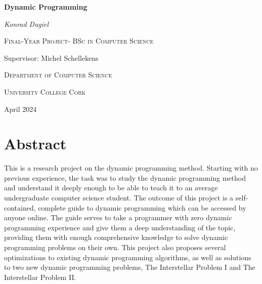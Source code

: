 \documentclass[12pt]{report}
\theoremstyle{definition}
\begin{document}
\begin{titlepage}
    \centering
    {\huge\bfseries Dynamic Programming\par}
    \vspace{2cm}
    {\Large\itshape Konrad Dagiel\par}
    \vspace{1cm}
    {\scshape\Large Final-Year Project- BSc in Computer Science \par}
    \vspace{1cm}
    {\Large Supervisor: Michel Schellekens \par}
    \vspace{1cm}
    {\scshape\Large Department of Computer Science \par}
    \vspace{1cm}
    {\scshape\LARGE University College Cork \par}
    \vspace{1.5cm}
    {\large April 2024\par}
\end{titlepage}

\chapter*{Abstract}
This is a research project on the dynamic programming method.
Starting with no previous experience, the task was to study the dynamic programming method and understand it deeply enough to be able to teach it to an average undergraduate computer science student.
The outcome of this project is a self-contained, complete guide to dynamic programming which can be accessed by anyone online.
The guide serves to take a programmer with zero dynamic programming experience and give them a deep understanding of the topic,
providing them with enough comprehensive knowledge to solve dynamic programming problems on their own.
This project also proposes several optimizations to existing dynamic programming algorithms,
as well as solutions to two new dynamic programming problems, The Interstellar Problem I and The Interstellar Problem II.
\end{document}
